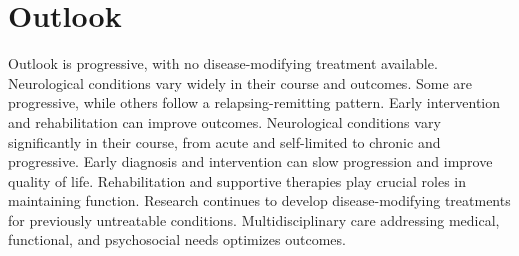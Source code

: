 \section{Outlook}
Outlook is progressive, with no disease-modifying treatment available. Neurological conditions vary widely in their course and outcomes. Some are progressive, while others follow a relapsing-remitting pattern. Early intervention and rehabilitation can improve outcomes. Neurological conditions vary significantly in their course, from acute and self-limited to chronic and progressive. Early diagnosis and intervention can slow progression and improve quality of life. Rehabilitation and supportive therapies play crucial roles in maintaining function. Research continues to develop disease-modifying treatments for previously untreatable conditions. Multidisciplinary care addressing medical, functional, and psychosocial needs optimizes outcomes.
